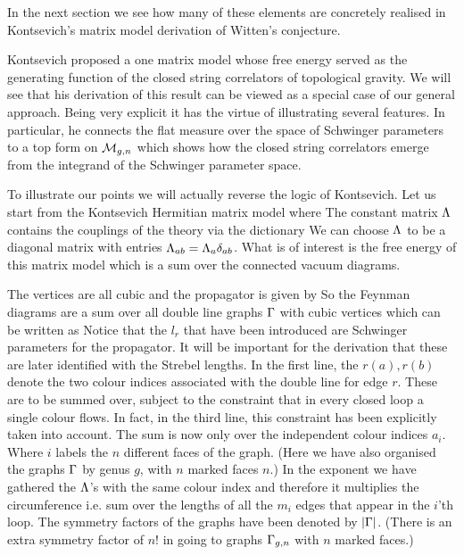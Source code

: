 In the next section we see how many of these  
elements are concretely realised in Kontsevich's 
matrix model derivation of Witten's conjecture. 


Kontsevich proposed a one matrix model whose free energy served as the 
generating function of the closed string correlators 
of topological gravity. We will see that his derivation of this result 
can be viewed as a special case of our general approach. Being very 
explicit it has the virtue of illustrating several features. In 
particular, he connects the flat measure over the space of Schwinger
parameters to a top form on ${\cal M}_{g,n}$ which shows how 
the closed string correlators emerge from the integrand of the Schwinger
parameter space. 

To illustrate our points we will actually reverse the logic of Kontsevich.
Let us start from the Kontsevich Hermitian matrix model 
\eqn{}
where
\eqn{}
The constant matrix ${\Lambda}$ contains the couplings of the theory via the 
dictionary
\eqn{}
We can choose ${\Lambda}$ to be a diagonal matrix with entries 
${\Lambda}_{ab}={\Lambda}_a{\delta}_{ab}$.
What is of interest is the free energy of this matrix model which 
is a sum over the connected vacuum diagrams. 

The vertices are all cubic and 
the propagator is given by  
\eqn{}
So the Feynman diagrams are a sum over all 
double line graphs ${\Gamma}$ with cubic vertices which can be written as
\eqn{}
Notice that the $l_r$ that have been introduced are Schwinger parameters 
for the propagator. It will be important for the derivation that these
are later identified with the Strebel lengths. 
In the first line, the $r(a), r(b)$ denote the two 
colour indices associated with the double line 
for edge $r$. These are to be summed over,
subject to the constraint that in every closed loop a single colour flows. 
In fact, in the third line, this constraint has been explicitly taken into 
account. The sum is now only over the independent colour indices $a_i$. Where
$i$ labels the $n$ different faces of the graph. (Here we have also organised 
the graphs ${\Gamma}$ by genus $g$, with $n$ marked faces $n$.) 
In the exponent we have gathered the ${\Lambda}$'s with the same 
colour index and therefore it multiplies the circumference
\eqn{} 
i.e. sum
over the lengths of all the $m_i$ edges that appear in the $i$'th loop. 
The symmetry factors 
of the graphs have been denoted by $|{\Gamma}|$. (There is an extra symmetry 
factor of $n!$ in going to graphs ${\Gamma}_{g,n}$ with $n$ marked faces.)  


